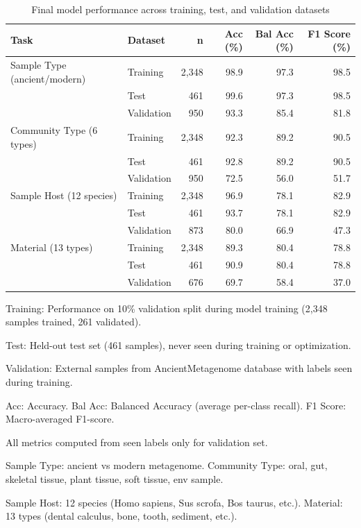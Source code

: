 \begin{table}[!t]
\centering
\caption{Final model performance across training, test, and validation datasets\label{tab:performance}}
\small
\begin{tabular*}{\textwidth}{@{\extracolsep{\fill}}llrrrr@{\extracolsep{\fill}}}
\toprule
Task & Dataset & n & Acc (\%) & Bal Acc (\%) & F1 Score (\%) \\
\midrule
Sample Type (ancient/modern) & Training & 2,348 & 98.9 & 97.3 & 98.5 \\
 & Test & 461 & 99.6 & 97.3 & 98.5 \\
 & Validation & 950 & 93.3 & 85.4 & 81.8 \\
\addlinespace
Community Type (6 types) & Training & 2,348 & 92.3 & 89.2 & 90.5 \\
 & Test & 461 & 92.8 & 89.2 & 90.5 \\
 & Validation & 950 & 72.5 & 56.0 & 51.7 \\
\addlinespace
Sample Host (12 species) & Training & 2,348 & 96.9 & 78.1 & 82.9 \\
 & Test & 461 & 93.7 & 78.1 & 82.9 \\
 & Validation & 873 & 80.0 & 66.9 & 47.3 \\
\addlinespace
Material (13 types) & Training & 2,348 & 89.3 & 80.4 & 78.8 \\
 & Test & 461 & 90.9 & 80.4 & 78.8 \\
 & Validation & 676 & 69.7 & 58.4 & 37.0 \\
\bottomrule
\end{tabular*}
\begin{tablenotes}
\item Training: Performance on 10\% validation split during model training (2,348 samples trained, 261 validated).
\item Test: Held-out test set (461 samples), never seen during training or optimization.
\item Validation: External samples from AncientMetagenome database with labels seen during training.
\item Acc: Accuracy. Bal Acc: Balanced Accuracy (average per-class recall). F1 Score: Macro-averaged F1-score.
\item All metrics computed from seen labels only for validation set.
\item Sample Type: ancient vs modern metagenome. Community Type: oral, gut, skeletal tissue, plant tissue, soft tissue, env sample.
\item Sample Host: 12 species (Homo sapiens, Sus scrofa, Bos taurus, etc.). Material: 13 types (dental calculus, bone, tooth, sediment, etc.).
\end{tablenotes}
\end{table}